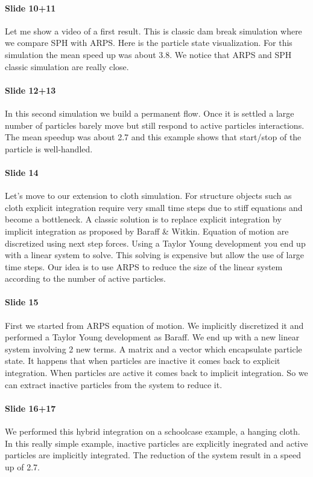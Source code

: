 \documentclass[twocolumn]{article}
\begin{document}
\paragraph{Slide 10+11}
Let me show a video of a first result.
This is classic dam break simulation where we compare SPH with ARPS. 
Here is the particle state visualization.
For this simulation the mean speed up was about 3.8.
We notice that ARPS and SPH classic simulation are really close.
\paragraph{Slide 12+13}
In this second simulation we build a permanent flow.
Once it is settled a large number of particles barely move but still respond to active particles interactions.
The mean speedup was about 2.7 and this example shows that start/stop of the particle is well-handled.
\paragraph{Slide 14}
Let's move to our extension to cloth simulation.
For structure objects such as cloth explicit integration require very small time steps due to stiff equations and become a bottleneck.
A classic solution is to replace explicit integration by implicit integration as proposed by Baraff \& Witkin.
Equation of motion are discretized using next step forces.
Using a Taylor Young development you end up with a linear system to solve.
This solving is expensive but allow the use of large time steps.
Our idea is to use ARPS to reduce the size of the linear system according to the number of active particles.
\paragraph{Slide 15}
First we started from ARPS equation of motion.
We implicitly discretized it and performed a Taylor Young development as Baraff.
We end up with a new linear system involving 2 new terms.
A matrix and a vector which encapsulate particle state.
It happens that when particles are inactive it comes back to explicit integration.
When particles are active it comes back to implicit integration.
So we can extract inactive particles from the system to reduce it.
\paragraph{Slide 16+17}
We performed this hybrid integration on a schoolcase example, a hanging cloth.
In this really simple example, inactive particles are explicitly inegrated and active particles are implicitly integrated.
The reduction of the system result in a speed up of 2.7.
\end{document}
